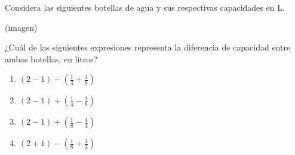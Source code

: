 \begin{problem}
    Considera las siguientes botellas de agua y sus respectivas capacidades en L.

    \begin{center}
    (imagen)
    \end{center}

    ¿Cuál de las siguientes expresiones representa la diferencia de capacidad entre ambas botellas, en litros?

    \begin{enumerate}[label=\Alph*.]
        \item $(2 - 1) - \left(\frac{1}{4} + \frac{1}{8}\right)$
        \item $(2 - 1) + \left(\frac{1}{4} - \frac{1}{8}\right)$
        \item $(2 - 1) + \left(\frac{1}{8} - \frac{1}{4}\right)$
        \item $(2 + 1) - \left(\frac{1}{8} + \frac{1}{4}\right)$
    \end{enumerate}
\end{problem}
